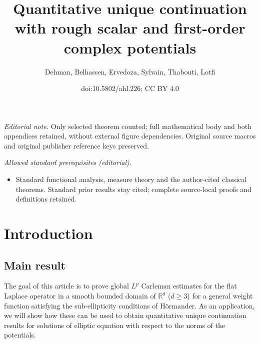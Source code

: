 \documentclass[10pt]{amsart}
\title{Quantitative unique continuation with rough scalar and first-order complex potentials}
\author{Dehman, Belhassen, Ervedoza, Sylvain, Thabouti, Lotfi}
\date{doi:10.5802/ahl.226; CC BY 4.0}
\theoremstyle{definition}\newtheorem{defi}[theo]{Definition}\newtheorem{rema}[theo]{Remark}\newtheorem{exam}[theo]{Example}\newtheorem{exem}[theo]{Example}\newtheorem{nota}[theo]{Notation}
\newcommand*\R{\mathbb{R}}
\renewcommand{\geq}{\geqslant}
\begin{document}
\maketitle
\noindent\textit{Editorial note.} Only selected theorem counted; full mathematical body and both appendices retained, without external figure dependencies. Original source macros and original publisher reference keys preserved.\par\medskip
\noindent\textit{Allowed standard prerequisites (editorial).}\begin{itemize}
\item Standard functional analysis, measure theory and the author-cited classical theorems. Standard prior results stay cited; complete source-local proofs and definitions retained.
\end{itemize}\medskip

\section{Introduction}

\subsection*{Main result}
The goal of this article is to prove global $L^p$ Carleman estimates for the flat Laplace operator in a smooth bounded domain of $\R^d$ ($d \geq 3$) for a general weight function satisfying the sub-ellipticity conditions of Hörmander. As an application, we will show how these can be used to obtain quantitative unique continuation results for solutions of elliptic equation with respect to the norms of the potentials.
\end{document}
